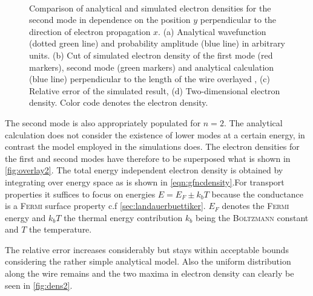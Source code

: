 \begin{figure}[h]
  \begin{center}
 \qquad
    \\
    \qquad
    \caption{Comparison of analytical and simulated electron densities for the second mode in dependence on the position $y$ perpendicular to the direction of electron propagation $x$. (a) Analytical wavefunction (dotted green line) and probability amplitude (blue line) in arbitrary units. (b) Cut of simulated electron density of the first mode (red markers), second mode (green markers) and analytical calculation (blue line) perpendicular to the length of the wire overlayed , (c) Relative error of the simulated result, (d) Two-dimensional electron density. Color code denotes the electron density.}\label{fig:mode2}
  \end{center}
\end{figure}
The second mode is also appropriately populated for $n=2$. The analytical calculation does not consider the existence of lower modes at a certain energy, in contrast the model employed in the simulations does. The electron densities for the first and second modes have therefore to be superposed what is shown in \cref{fig:overlay2}. The total energy independent electron density is obtained by integrating over energy space as is shown in \cref{eqn:gfncdensity}.For transport properties it suffices to focus on energies $E=E_F\pm k_bT$ because the conductance is a \textsc{Fermi} surface property c.f \cref{sec:landauerbuettiker}. $E_F$ denotes the \textsc{Fermi} energy and $k_bT$ the thermal energy contribution $k_b$ being the \textsc{Boltzmann} constant and $T$ the temperature.\par
The relative error increases considerably but stays within acceptable bounds considering the rather simple analytical model.
Also the uniform distribution along the wire remains and the two maxima in electron density can clearly be seen in \cref{fig:dens2}.\par
